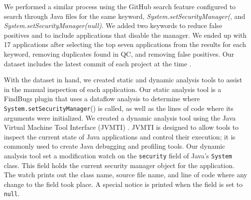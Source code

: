 \documentclass{sig-alternate}
\begin{document}
We performed a similar process using the GitHub search feature configured
to search through Java files for the same keyword, \textit{System.setSecurityManager(},
and \textit{System.setSecurityManager(null)}. We added two keywords
to reduce false positives and to include applications that disable
the manager. We ended up with 17 applications after selecting the
top seven applications from the results for each keyword, removing
duplicates found in QC, and removing false positives. Our dataset
includes the latest commit of each project at the time .

With the dataset in hand, we created static and dynamic analysis tools
to assist in the manual inspection of each application. Our static
analysis tool is a FindBugs \cite{hovemeyer_finding_2004} plugin
that uses a dataflow analysis to determine where \texttt{System.setSecurityManager}()
is called, as well as the lines of code where its arguments were initialized.
We created a dynamic analysis tool using the Java Virtual Machine
Tool Interface (JVMTI) \cite{_jvmti}. JVMTI is designed to allow
tools to inspect the current state of Java applications and control
their execution; it is commonly used to create Java debugging and
profiling tools. Our dynamic analysis tool set a modification watch
on the \texttt{security} field of Java's \texttt{System} class. This
field holds the current security manager object for the application.
The watch prints out the class name, source file name, and line of
code where any change to the field took place. A special notice is
printed when the field is set to \texttt{null}. 
\end{document}
